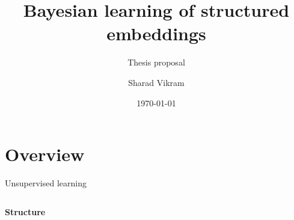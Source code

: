 \documentclass[10pt, compress]{beamer}
\title{Bayesian learning of structured embeddings}
\subtitle{Thesis proposal}
\date{\today}
\author{Sharad Vikram}
\institute{UCSD}
\begin{document}
\begin{frame}
  \titlepage
\end{frame}

\section{Overview}

\begin{frame}{Unsupervised learning}
  \begin{columns}[T]
    \begin{column}{0.5\textwidth}
      \begin{overlayarea}{\textwidth}{7cm}
        \begin{center}
          \Large \textbf{Structure}\\ \vspace{10pt}

\end{center}
\end{overlayarea}
\end{column}
\end{columns}
\end{frame}
\end{document}
